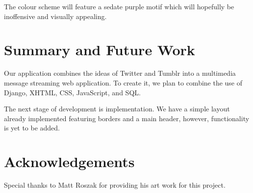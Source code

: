 \documentclass{sig-alt-release2}
\begin{document}
The colour scheme will feature a sedate purple motif which will hopefully be inoffensive and visually appealing.

\section{Summary and Future Work}

Our application combines the ideas of Twitter and Tumblr into a multimedia message streaming web application. To create it, we plan to combine the use of Django, XHTML, CSS, JavaScript, and SQL.

The next stage of development is implementation. We have a simple layout already implemented featuring borders and a main header, however, functionality is yet to be added.

\section{Acknowledgements}

Special thanks to Matt Roszak for providing his art work for this project.



\end{document}
